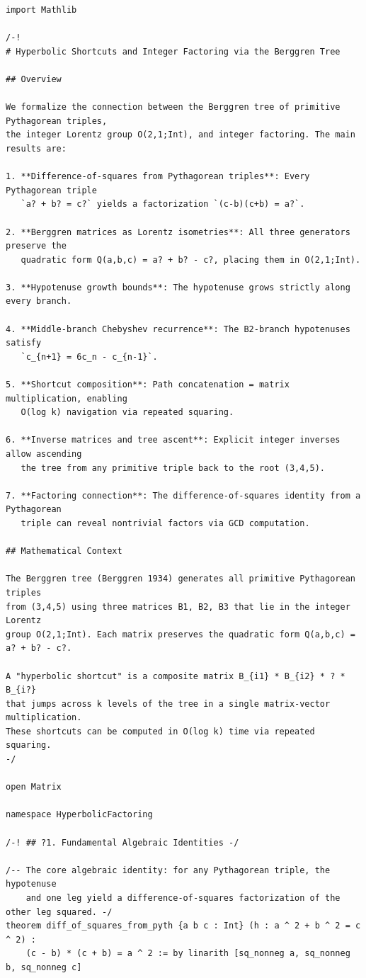 \documentclass[11pt,twoside,openright]{book}
\theoremstyle{definition}
\theoremstyle{remark}
\begin{document}
\begin{lstlisting}[style=lean]
import Mathlib

/-!
# Hyperbolic Shortcuts and Integer Factoring via the Berggren Tree

## Overview

We formalize the connection between the Berggren tree of primitive Pythagorean triples,
the integer Lorentz group O(2,1;Int), and integer factoring. The main results are:

1. **Difference-of-squares from Pythagorean triples**: Every Pythagorean triple
   `a? + b? = c?` yields a factorization `(c-b)(c+b) = a?`.

2. **Berggren matrices as Lorentz isometries**: All three generators preserve the
   quadratic form Q(a,b,c) = a? + b? - c?, placing them in O(2,1;Int).

3. **Hypotenuse growth bounds**: The hypotenuse grows strictly along every branch.

4. **Middle-branch Chebyshev recurrence**: The B2-branch hypotenuses satisfy
   `c_{n+1} = 6c_n - c_{n-1}`.

5. **Shortcut composition**: Path concatenation = matrix multiplication, enabling
   O(log k) navigation via repeated squaring.

6. **Inverse matrices and tree ascent**: Explicit integer inverses allow ascending
   the tree from any primitive triple back to the root (3,4,5).

7. **Factoring connection**: The difference-of-squares identity from a Pythagorean
   triple can reveal nontrivial factors via GCD computation.

## Mathematical Context

The Berggren tree (Berggren 1934) generates all primitive Pythagorean triples
from (3,4,5) using three matrices B1, B2, B3 that lie in the integer Lorentz
group O(2,1;Int). Each matrix preserves the quadratic form Q(a,b,c) = a? + b? - c?.

A "hyperbolic shortcut" is a composite matrix B_{i1} * B_{i2} * ? * B_{i?}
that jumps across k levels of the tree in a single matrix-vector multiplication.
These shortcuts can be computed in O(log k) time via repeated squaring.
-/

open Matrix

namespace HyperbolicFactoring

/-! ## ?1. Fundamental Algebraic Identities -/

/-- The core algebraic identity: for any Pythagorean triple, the hypotenuse
    and one leg yield a difference-of-squares factorization of the other leg squared. -/
theorem diff_of_squares_from_pyth {a b c : Int} (h : a ^ 2 + b ^ 2 = c ^ 2) :
    (c - b) * (c + b) = a ^ 2 := by linarith [sq_nonneg a, sq_nonneg b, sq_nonneg c]


\end{lstlisting}
\end{document}
